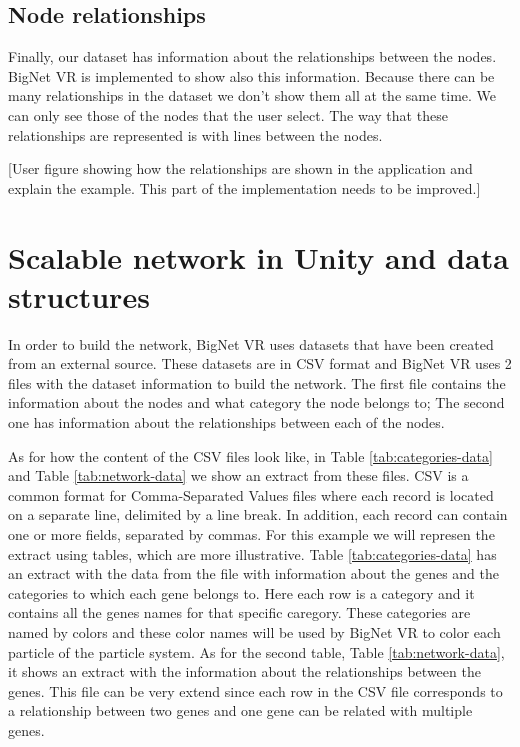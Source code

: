 \subsection{Node relationships}
Finally, our dataset has information about the relationships between the nodes. BigNet VR is implemented to show also this information. Because there can be many relationships in the dataset we don't show them all at the same time. We can only see those of the nodes that the user select. The way that these relationships are represented is with lines between the nodes.

[User figure showing how the relationships are shown in the application and explain the example. This part of the implementation needs to be improved.]


\section{Scalable network in Unity and data structures}
In order to build the network, BigNet VR uses datasets that have been created from an external source. These datasets are in CSV format and BigNet VR uses 2 files with the dataset information to build the network. The first file contains the information about the nodes and what category the node belongs to; The second one has information about the relationships between each of the nodes.

As for how the content of the CSV files look like, in Table \ref{tab:categories-data} and Table \ref{tab:network-data} we show an extract from these files. CSV\cite{csv} is a common format for Comma-Separated Values files where each record is located on a separate line, delimited by a line break. In addition, each record can contain one or more fields, separated by commas. For this example we will represen the extract using tables, which are more illustrative. Table \ref{tab:categories-data} has an extract with the data from the file with information about the genes and the categories to which each gene belongs to. Here each row is a category and it contains all the genes names for that specific caregory. These categories are named by colors and these color names will be used by BigNet VR to color each particle of the particle system. As for the second table, Table \ref{tab:network-data}, it shows an extract with the information about the relationships between the genes. This file can be very extend since each row in the CSV file corresponds to a relationship between two genes and one gene can be related with multiple genes.

